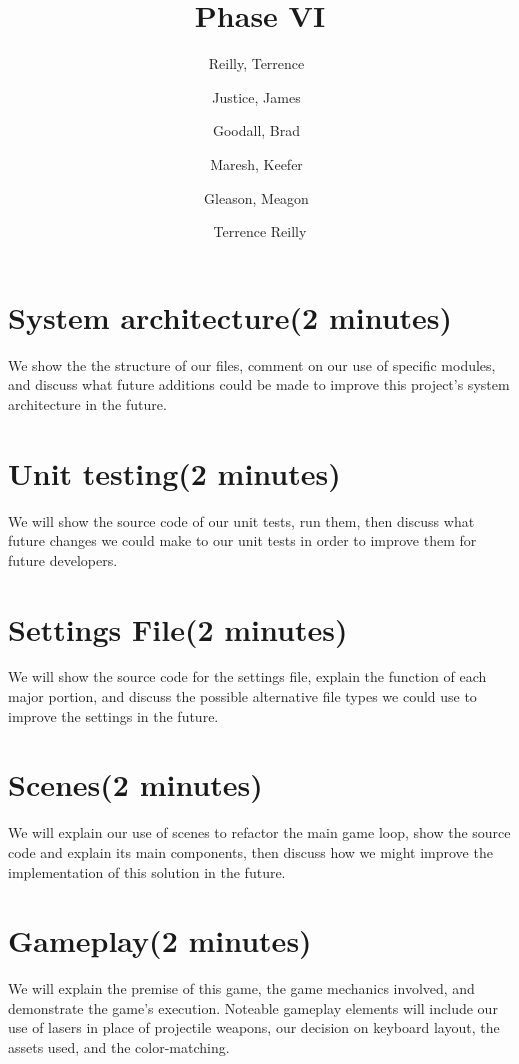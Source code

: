 \documentclass[a4paper,12pt]{article}
\author{%
    Reilly, Terrence\
    \and
    Justice, James\
    \and
    Goodall, Brad\
    \and
    Maresh, Keefer\
    \and
    Gleason, Meagon\
}
\author{Terrence Reilly}
\title{Phase VI}
\begin{document}
    \maketitle

    \section*{System architecture(2 minutes)}
We show the the structure of our files, comment on our use of 
specific modules, and discuss what future additions could be made
to improve this project's system architecture in the future. 

    \section*{Unit testing(2 minutes)}
We will show the source code of our unit tests, run them, then
discuss what future changes we could make to our unit tests in
order to improve them for future developers.

    \section*{Settings File(2 minutes)}
We will show the source code for the settings file, explain
the function of each major portion, and discuss the possible
alternative file types we could use to improve the settings in
the future.

    \section*{Scenes(2 minutes)}
We will explain our use of scenes to refactor the main game loop, 
show the source code and explain its main components, then
discuss how we might improve the implementation of this solution
in the future.

    \section*{Gameplay(2 minutes)}
We will explain the premise of this game, the game mechanics involved,
and demonstrate the game's execution. Noteable gameplay elements will
include our use of lasers in place of projectile weapons, our decision
on keyboard layout, the assets used, and the color-matching.
\end{document}
